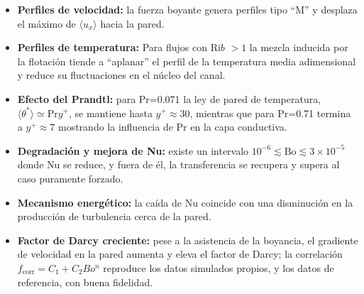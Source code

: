 \begin{itemize}

\item \textbf{Perfiles de velocidad:} la fuerza boyante genera perfiles tipo ``M'' y desplaza el máximo de $\langle u_x\rangle$ hacia la pared.

\item \textbf{Perfiles de temperatura:} Para flujos con Ri$b$ $>1$  la mezcla inducida por la flotación tiende a ``aplanar'' el perfil de la temperatura media adimensional y reduce su fluctuaciones en el núcleo del canal.

\item \textbf{Efecto del Prandtl:} para Pr=0.071 la ley de pared de temperatura, $\langle\theta^*\rangle \simeq \text{Pr} y^+$, se mantiene hasta $y^+ \approx 30$, mientras que para Pr=0.71 termina a $y^+ \approx 7$ mostrando la influencia de Pr en la capa conductiva.

\item \textbf{Degradación y mejora de Nu:} existe un intervalo $10^{-6} \lesssim \text{Bo} \lesssim 3 \times 10^{-5}$ donde Nu se reduce, y fuera de él, la transferencia se recupera y supera al caso puramente forzado.

\item \textbf{Mecanismo energético:} la caída de Nu coincide con una disminución en la producción de turbulencia cerca de la pared.

\item \textbf{Factor de Darcy creciente:} pese a la asistencia de la boyancia, el gradiente de velocidad en la pared aumenta y eleva el factor de Darcy; la correlación $f_{\text{corr}}=C_1+C_2 Bo^n$ reproduce los datos simulados propios, y los datos de referencia, con buena fidelidad.

\end{itemize}

